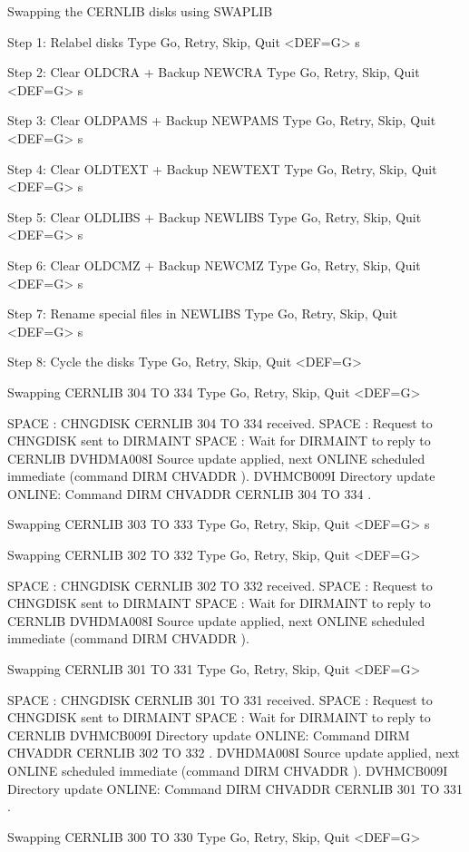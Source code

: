 \begin{XMPt}{Swapping the CERNLIB disks using SWAPLIB}
 
 Step 1: Relabel disks
 Type Go, Retry, Skip, Quit <DEF=G>
 s
 
 Step 2: Clear OLDCRA + Backup NEWCRA
 Type Go, Retry, Skip, Quit <DEF=G>
 s
 
 Step 3: Clear OLDPAMS + Backup NEWPAMS
 Type Go, Retry, Skip, Quit <DEF=G>
 s
 
 Step 4: Clear OLDTEXT + Backup NEWTEXT
 Type Go, Retry, Skip, Quit <DEF=G>
 s
 
 Step 5: Clear OLDLIBS + Backup NEWLIBS
 Type Go, Retry, Skip, Quit <DEF=G>
 s
 
 Step 6: Clear OLDCMZ + Backup NEWCMZ
 Type Go, Retry, Skip, Quit <DEF=G>
 s
 
 Step 7: Rename special files in NEWLIBS
 Type Go, Retry, Skip, Quit <DEF=G>
 s
 
 Step 8: Cycle the disks
 Type Go, Retry, Skip, Quit <DEF=G>
 
 
 Swapping CERNLIB 304 TO 334
 Type Go, Retry, Skip, Quit <DEF=G>
 
 SPACE : CHNGDISK CERNLIB 304 TO 334 received.
 SPACE : Request to CHNGDISK sent to DIRMAINT
 SPACE : Wait for DIRMAINT to reply to CERNLIB
 DVHDMA008I Source update applied, next ONLINE scheduled immediate (command
    DIRM CHVADDR ).
 DVHMCB009I Directory update ONLINE: Command DIRM CHVADDR CERNLIB 304 TO 334 .
 
 Swapping CERNLIB 303 TO 333
 Type Go, Retry, Skip, Quit <DEF=G>
 s
 
 Swapping CERNLIB 302 TO 332
 Type Go, Retry, Skip, Quit <DEF=G>
 
 SPACE : CHNGDISK CERNLIB 302 TO 332 received.
 SPACE : Request to CHNGDISK sent to DIRMAINT
 SPACE : Wait for DIRMAINT to reply to CERNLIB
 DVHDMA008I Source update applied, next ONLINE scheduled immediate (command
    DIRM CHVADDR ).
 
 Swapping CERNLIB 301 TO 331
 Type Go, Retry, Skip, Quit <DEF=G>
 
 SPACE : CHNGDISK CERNLIB 301 TO 331 received.
 SPACE : Request to CHNGDISK sent to DIRMAINT
 SPACE : Wait for DIRMAINT to reply to CERNLIB
 DVHMCB009I Directory update ONLINE: Command DIRM CHVADDR CERNLIB 302 TO 332 .
 DVHDMA008I Source update applied, next ONLINE scheduled immediate (command
    DIRM CHVADDR ).
 DVHMCB009I Directory update ONLINE: Command DIRM CHVADDR CERNLIB 301 TO 331 .
 
 Swapping CERNLIB 300 TO 330
 Type Go, Retry, Skip, Quit <DEF=G>
 

\end{XMPt}
